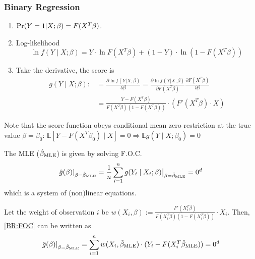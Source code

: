 \documentclass[11pt]{elegantbook}
\begin{document}
\subsubsection*{Binary Regression}
\begin{enumerate}
    \item $\textnormal{Pr}(Y=1|X;\beta)=F(X^T\beta)$.
    \item Log-likelihood $$\ln f(Y\mid X;\beta)=Y\cdot \ln F(X^T\beta)+(1-Y)\cdot \ln (1-F(X^T\beta))$$
    \item Take the derivative, the score is
    \begin{equation}
        \begin{aligned}
            g(Y\mid X;\beta):&=\frac{\partial \ln f(Y|X;\beta)}{\partial \beta}=\frac{\partial \ln f(Y|X,\beta)}{\partial F(X^T\beta)}\frac{\partial F(X^T\beta)}{\partial \beta}\\
            &=\frac{Y-F(X^T\beta)}{F(X^T\beta)(1-F(X^T\beta))}\cdot\left(F'(X^T\beta)\cdot X\right)
        \end{aligned}
        \nonumber
    \end{equation}
\end{enumerate}
Note that the score function obeys conditional mean zero restriction at the true value $\beta = \beta_0$: $\mathbb{E}[Y-F(X^T\beta_0)\mid X]=0 \Rightarrow \mathbb{E} g(Y\mid X;\beta_0)=0$

The MLE ($\hat{\beta}_\textnormal{MLE}$) is given by solving F.O.C.
\begin{equation}
    \begin{aligned}
        \hat{g}(\beta)|_{\beta=\hat{\beta}_\textnormal{MLE}}=\frac{1}{n}\sum_{i=1}^ng(Y_i\mid X_i;\beta)\big|_{\beta=\hat{\beta}_\textnormal{MLE}}=0^d
    \end{aligned}
    \label{BR:FOC}
\end{equation}
which is a system of (non)linear equations.

Let the weight of observation $i$ be $w(X_i,\beta):=\frac{F'(X_i^T\beta)}{F(X_i^T\beta)(1-F(X_i^T\beta))}\cdot X_i$. Then, \eqref{BR:FOC} can be written as
\begin{equation}
    \begin{aligned}
        \hat{g}(\beta)|_{\beta=\hat{\beta}_\textnormal{MLE}}=\sum_{i=1}^n w(X_i,\hat{\beta}_\textnormal{MLE})\cdot (Y_i-F(X_i^T\hat{\beta}_\textnormal{MLE}))=0^d
    \end{aligned}
    \nonumber
\end{equation}
\end{document}
